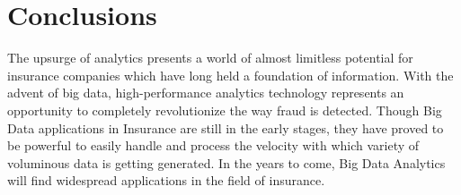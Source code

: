 \documentclass[sigconf]{acmart}
\begin{document}
\section{Conclusions}
The upsurge of analytics presents a world of almost limitless potential for insurance companies which have long held a foundation of information.  With the advent of big data, high-performance analytics technology represents an opportunity to completely revolutionize the way fraud is detected. Though Big Data applications in Insurance are still in the early stages, they have proved to be powerful to easily handle and process the velocity with which variety of voluminous data is getting generated. In the years to come, Big Data Analytics will find widespread applications in the field of insurance.



 
\end{document}
